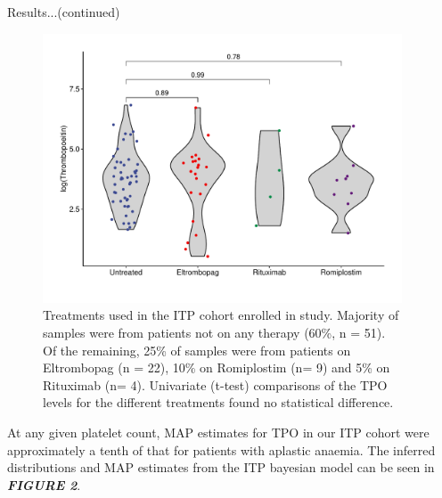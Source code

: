\documentclass[landscape,a0paper,fontscale=0.285]{beamer} %
\newlength{\onecolwid}
\newlength{\twocolwid}
\begin{document}
\begin{frame}[t]
\begin{columns}[t]
\begin{column}{\twocolwid}
\begin{columns}[t,totalwidth=\twocolwid]
\begin{column}{\onecolwid}
\end{column} %

\begin{column}{\onecolwid} %

\begin{block}{Results...(continued)}
\begin{figure}[H]
\includegraphics[width=1\linewidth]{fig/Static_diff_itp_only.pdf}
\caption{Treatments used in the ITP cohort enrolled in study. Majority of samples were from patients not on any therapy (60\%, n = 51). Of the remaining, 25\% of samples were from patients on Eltrombopag (n = 22), 10\% on Romiplostim (n= 9) and 5\% on Rituximab (n= 4). Univariate (t-test) comparisons of the TPO levels for the different treatments found no statistical difference.} 
\end{figure}

At any given platelet count, MAP estimates for TPO in our ITP cohort were approximately a tenth of that for patients with aplastic anaemia. The inferred distributions and MAP estimates from the ITP bayesian model can be seen in \textbf{\emph{FIGURE 2}}.








\end{block}
\end{column}
\end{columns}
\end{column}
\end{columns}
\end{frame}
\end{document}
